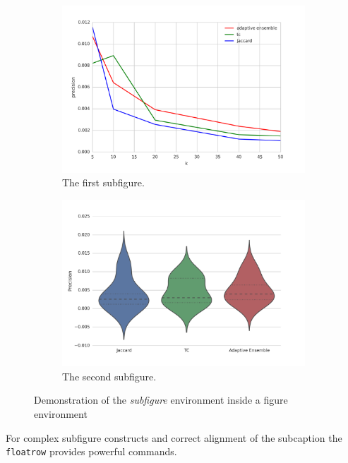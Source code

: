 \begin{figure}[htb]
  \begin{subfigure}[b]{.45\linewidth}
    \centering
    \includegraphics[width=0.95\linewidth]{images/precision_line.png}
    \caption{The first subfigure.}
    \label{fig:example:subfigures:a}
  \end{subfigure}%
  \begin{subfigure}[b]{.45\linewidth}
    \centering
    \includegraphics[width=0.95\linewidth]{images/precision_violin.png}
    \caption{The second subfigure.}
    \label{fig:example:subfigures:b}
  \end{subfigure}
  \caption{Demonstration of the \emph{subfigure} environment inside a figure environment}
  \label{fig:example:subfigures}
\end{figure}
%
For complex subfigure constructs and correct alignment of the subcaption the \texttt{floatrow} provides powerful commands. 


